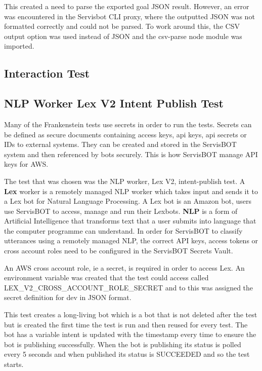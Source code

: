 \documentclass[12pt,a4paper,titlepage]{report}
\begin{document}
This created a need to parse the exported goal JSON result. However, an error was encountered in the Servisbot CLI proxy, where the outputted JSON was not formatted correctly and could not be parsed. 
To work around this, the CSV output option was used instead of JSON and the csv-parse node module was imported.

\subsection{Interaction Test}

\subsection{NLP Worker Lex V2 Intent Publish Test}
Many of the Frankenstein tests use secrets in order to run the tests. Secrets can be defined as secure documents containing access keys, api keys, api secrets or IDs to external systems. They can be created and stored in the ServisBOT system and then referenced by bots securely. 
This is how ServisBOT manage API keys for AWS\@.

The test that was chosen was the NLP worker, Lex V2, intent-publish test. A \textbf{Lex} worker is a remotely managed NLP worker which takes input and sends it to a Lex bot for Natural Language Processing. A Lex bot is an Amazon bot, users use ServisBOT to access, manage and run their Lexbots. 
\textbf{NLP} is a form of Artificial Intelligence that transforms text that a user submits into language that the computer programme can understand. In order for ServisBOT to classify utterances using a remotely managed NLP, the correct API keys, access tokens or cross account roles need to be configured in the ServisBOT Secrets Vault.

An AWS cross account role, ie a secret, is required in order to access Lex. An environment variable was created that the test could access called LEX\_V2\_CROSS\_ACCOUNT\_ROLE\_SECRET and to this was assigned the secret definition for dev in JSON format. 

This test creates a long-living bot which is a bot that is not deleted after the test but is created the first time the test is run and then reused for every test. 
The bot has a variable intent is updated with the timestamp every time to ensure the bot is publishing successfully. When the bot is publishing its status is polled every 5 seconds and when published its status is SUCCEEDED and so the test starts.
\end{document}
